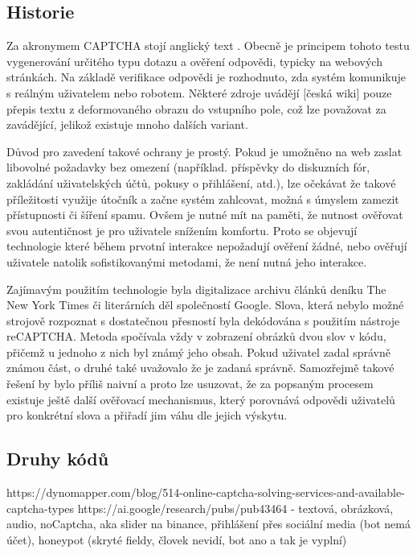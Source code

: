 \documentclass[
  master=true,
  biblatex,
  glossaries,
  index
]{kidiplom}
\begin{document}
\subsection{Historie}
Za akronymem CAPTCHA stojí anglický text . Obecně je principem tohoto testu vygenerování určitého typu dotazu a ověření odpovědi, typicky na webových stránkách. Na základě verifikace odpovědi je rozhodnuto, zda systém komunikuje s reálným uživatelem nebo robotem. Některé zdroje uvádějí [česká wiki] pouze přepis textu z deformovaného obrazu do vstupního pole, což lze považovat za zavádějící, jelikož existuje mnoho dalších  variant. 

Důvod pro zavedení takové ochrany je prostý. Pokud je umožněno na web zaslat libovolné požadavky bez omezení (například. příspěvky do diskuzních fór, zakládání uživatelských účtů, pokusy o přihlášení, atd.), lze očekávat že takové příležitosti využije útočník a začne systém zahlcovat, možná s úmyslem zamezit přístupnosti či šíření spamu. Ovšem je nutné mít na paměti, že nutnost ověřovat svou autentičnost je pro uživatele snížením komfortu. Proto se objevují technologie které během prvotní interakce nepožadují ověření žádné, nebo ověřují uživatele natolik sofistikovanými metodami, že není nutná jeho	 interakce.


Zajímavým použitím technologie byla digitalizace archivu článků deníku The New York Times či literárních děl společností Google. Slova, která nebylo možné strojově rozpoznat s dostatečnou přesností byla dekódována s použitím nástroje reCAPTCHA. Metoda spočívala vždy v zobrazení obrázků dvou slov v kódu, přičemž u jednoho z nich byl známý jeho obsah. Pokud uživatel zadal správně známou část, o druhé také uvažovalo že je zadaná správně. Samozřejmě takové řešení by bylo příliš naivní a proto lze usuzovat, že za popsaným procesem existuje ještě další ověřovací mechanismus, který porovnává odpovědi uživatelů pro konkrétní slova a přiřadí jim váhu dle jejich výskytu. 
\subsection{Druhy kódů}
https://dynomapper.com/blog/514-online-captcha-solving-services-and-available-captcha-types
https://ai.google/research/pubs/pub43464
 - textová, obrázková, audio, noCaptcha, aka slider na binance, přihlášení přes sociální media (bot nemá účet), honeypot (skryté fieldy, človek nevidí, bot ano a tak je vyplní)
 
\end{document}
